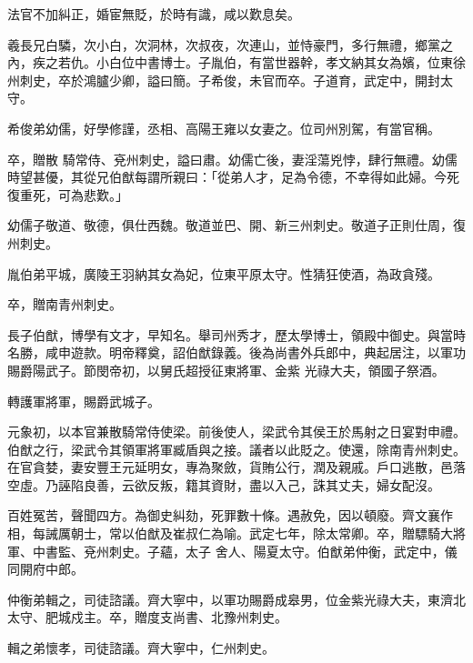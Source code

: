 \begin{pinyinscope}
 法官不加糾正，婚宦無貶，於時有識，咸以歎息矣。



 羲長兄白驎，次小白，次洞林，次叔夜，次連山，並恃豪門，多行無禮，鄉黨之內，疾之若仇。小白位中書博士。子胤伯，有當世器幹，孝文納其女為嬪，位東徐州刺史，卒於鴻臚少卿，謚曰簡。子希俊，未官而卒。子道育，武定中，開封太守。



 希俊弟幼儒，好學修謹，丞相、高陽王雍以女妻之。位司州別駕，有當官稱。



 卒，贈散
 騎常侍、兗州刺史，謚曰肅。幼儒亡後，妻淫蕩兇悖，肆行無禮。幼儒時望甚優，其從兄伯猷每謂所親曰：「從弟人才，足為令德，不幸得如此婦。今死復重死，可為悲歎。」



 幼儒子敬道、敬德，俱仕西魏。敬道並巴、開、新三州刺史。敬道子正則仕周，復州刺史。



 胤伯弟平城，廣陵王羽納其女為妃，位東平原太守。性猜狂使酒，為政貪殘。



 卒，贈南青州刺史。



 長子伯猷，博學有文才，早知名。舉司州秀才，歷太學博士，領殿中御史。與當時名勝，咸申遊款。明帝釋奠，詔伯猷錄義。後為尚書外兵郎中，典起居注，以軍功賜爵陽武子。節閔帝初，以舅氏超授征東將軍、金紫
 光祿大夫，領國子祭酒。



 轉護軍將軍，賜爵武城子。



 元象初，以本官兼散騎常侍使梁。前後使人，梁武令其侯王於馬射之日宴對申禮。伯猷之行，梁武令其領軍將軍臧盾與之接。議者以此貶之。使還，除南青州刺史。在官貪婪，妻安豐王元延明女，專為聚斂，貨賄公行，潤及親戚。戶口逃散，邑落空虛。乃誣陷良善，云欲反叛，籍其資財，盡以入己，誅其丈夫，婦女配沒。



 百姓冤苦，聲聞四方。為御史糾劾，死罪數十條。遇赦免，因以頓廢。齊文襄作相，每誡厲朝士，常以伯猷及崔叔仁為喻。武定七年，除太常卿。卒，贈驃騎大將軍、中書監、兗州刺史。子蘊，太子
 舍人、陽夏太守。伯猷弟仲衡，武定中，儀同開府中郎。



 仲衡弟輯之，司徒諮議。齊大寧中，以軍功賜爵成皋男，位金紫光祿大夫，東濟北太守、肥城戍主。卒，贈度支尚書、北豫州刺史。



 輯之弟懷孝，司徒諮議。齊大寧中，仁州刺史。




\end{pinyinscope}

